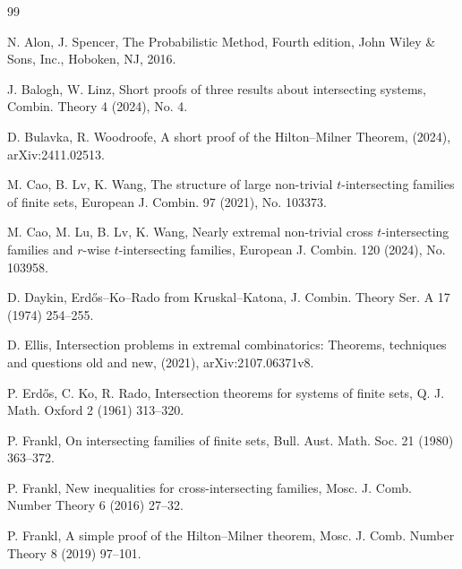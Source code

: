 \documentclass[11pt]{article}
\numberwithin{equation}{section}
\begin{document}
\begin{thebibliography}{99}


N. Alon, J. Spencer, The Probabilistic Method, Fourth edition, 
John Wiley \& Sons, Inc., Hoboken, NJ, 2016. 

J. Balogh, W. Linz, 
Short proofs of three results about intersecting systems, Combin. Theory 4 (2024), No. 4. 

D. Bulavka, R. Woodroofe, 
A short proof of the Hilton--Milner Theorem, 
(2024), arXiv:2411.02513. 

M. Cao, B. Lv, K. Wang, The structure of large non-trivial $t$-intersecting families
of finite sets, European J. Combin. 97 (2021), No. 103373.

M. Cao, M. Lu, B. Lv, K. Wang, 
Nearly extremal non-trivial cross $t$-intersecting families and $r$-wise $t$-intersecting families, 
European J. Combin. 120 (2024), No. 103958. 

D. Daykin, 
Erd\H{o}s--Ko--Rado from Kruskal--Katona, 
J. Combin. Theory Ser. A 17 (1974) 254--255.

D. Ellis, 
Intersection problems in extremal combinatorics: Theorems, techniques and questions old and new,  
(2021), arXiv:2107.06371v8.

P. Erd\H{o}s, C. Ko, R. Rado, Intersection theorems for systems of finite sets, Q. J. Math. Oxford 2 (1961) 313--320.





P. Frankl, On intersecting families of finite sets, Bull. Aust. Math. Soc. 21 (1980) 363--372.




P. Frankl, New inequalities for cross-intersecting families, Mosc. J. Comb. Number Theory 6 (2016) 27--32.

P. Frankl, A simple proof of the Hilton--Milner theorem,  Mosc. J. Comb. Number Theory 8 (2019) 97--101. 


\end{thebibliography}
\end{document}
